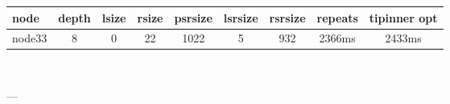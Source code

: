 

\begin{tabular}{|l|c|c|c|c|c|c|c|c|}
\hline node & depth & lsize & rsize & psrsize & lsrsize & rsrsize   & repeats & tipinner opt\\
    \hline node33 & 8 & 0 & 22 & 1022 & 5 & 932 & 2366ms & 2433ms\\

\hline
\end{tabular} \

---

